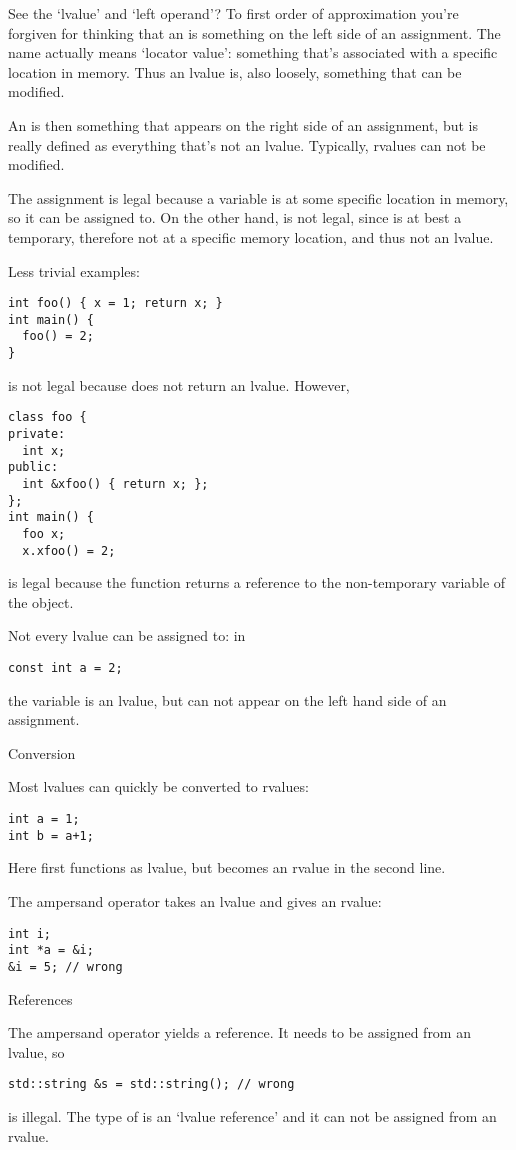 See the `lvalue' and `left operand'? To first order of approximation
you're forgiven for thinking that an  is something
on the left side of an assignment. The name actually means `locator
value': something that's associated with a specific location in
memory. Thus an lvalue is, also loosely, something that can be modified.

An  is then something that appears on the right
side of an assignment, but is really defined as everything that's not
an lvalue. Typically, rvalues can not be modified.

The assignment  is legal because a variable  is at some specific
location in memory, so it can be assigned to. On the other hand,
 is not legal, since  is at best a temporary,
therefore not at a specific memory location, and thus not an lvalue.

Less trivial examples:
\begin{verbatim}
int foo() { x = 1; return x; }
int main() {
  foo() = 2;
}
\end{verbatim}
is not legal because  does not return an lvalue. However,
\begin{verbatim}
class foo {
private:
  int x;
public:
  int &xfoo() { return x; };
};
int main() {
  foo x;
  x.xfoo() = 2;
\end{verbatim}
is legal because the function  returns a reference to the
non-temporary variable  of the  object.

Not every lvalue can be assigned to: in
\begin{verbatim}
const int a = 2;
\end{verbatim}
the variable  is an lvalue, but can not appear on the left hand
side of an assignment.

 {Conversion}

Most lvalues can quickly be converted to rvalues:
\begin{verbatim}
int a = 1;
int b = a+1;
\end{verbatim}
Here  first functions as lvalue, but becomes an rvalue in the
second line.

The ampersand operator takes an lvalue and gives an rvalue:
\begin{verbatim}
int i;
int *a = &i;
&i = 5; // wrong
\end{verbatim}

 {References}

The ampersand operator yields a reference. It needs to be assigned
from an lvalue, so
\begin{verbatim}
std::string &s = std::string(); // wrong
\end{verbatim}
is illegal. The type of  is an `lvalue reference' and it can not
be assigned from an rvalue.

